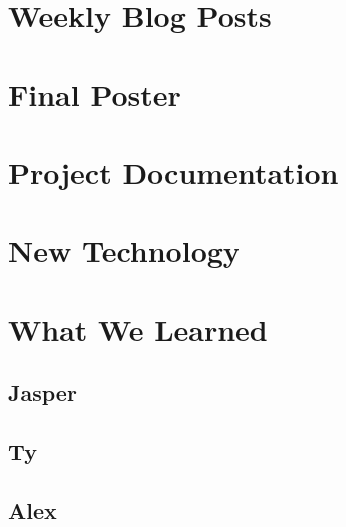 \documentclass[10pt,draftclsnofoot,onecolumn]{IEEEtran}
\begin{document}
\newpage
\section{Weekly Blog Posts} %


\newpage
\section{Final Poster} %

\newpage
\section{Project Documentation} %


\newpage
\section{New Technology} %

\newpage
\section{What We Learned} %
\subsection{Jasper}


\subsection{Ty}


\subsection{Alex}
\end{document}
